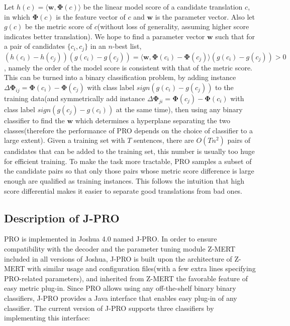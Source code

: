\documentclass[11pt]{article}
\begin{document}
Let $h(c)=\langle \mathbf{w},\mathbf{\Phi}(c)\rangle$ be the linear model score of a candidate translation $c$, in which $\mathbf{\Phi}(c)$ is the feature vector of $c$ and $\mathbf{w}$ is the parameter vector. Also let $g(c)$ be the metric score of $c$(without loss of generality, assuming higher score indicates better translation). We hope to find a parameter vector $\mathbf{w}$ such that for a pair of candidates $\{ c_i,c_j \}$ in an $n$-best list, $(h(c_i)-h(c_j))(g(c_i)-g(c_j))=\langle \mathbf{w},\mathbf{\Phi}(c_i) - \mathbf{\Phi}(c_j)\rangle (g(c_i)-g(c_j)) >0$, namely the order of the model score is consistent with that of the metric score. This can be turned into a binary classification problem, by adding instance $\Delta\mathbf{\Phi}_{ij}=\mathbf{\Phi}(c_i) - \mathbf{\Phi}(c_j)$ with class label $sign(g(c_i)-g(c_j))$ to the training data(and symmetrically add instance $\Delta\mathbf{\Phi}_{ji}=\mathbf{\Phi}(c_j) - \mathbf{\Phi}(c_i)$ with class label $sign(g(c_j)-g(c_i))$ at the same time), then using any binary classifier to find the $\mathbf{w}$ which determines a hyperplane separating the two classes(therefore the performance of PRO depends on the choice of classifier to a large extent). Given a training set with $T$ sentences, there are $O(Tn^2)$ pairs of candidates that can be added to the training set, this number is usually too huge for efficient training. To make the task more tractable, PRO samples a subset of the candidate pairs so that only those pairs whose metric score difference is large enough are qualified as training instances. This follows the intuition that high score differential makes it easier to separate good translations from bad ones.

\subsection{Description of J-PRO} \label{section:j-pro}
PRO is implemented in Joshua 4.0 named J-PRO. In order to ensure compatibility with the decoder and the parameter tuning module Z-MERT \cite{zaidan2009z} included in all versions of Joshua, J-PRO is built upon the architecture of Z-MERT with similar usage and configuration files(with a few extra lines specifying PRO-related parameters), and inherited from Z-MERT the favorable feature of easy metric plug-in. Since PRO allows using any off-the-shelf binary binary classifiers, J-PRO provides a Java interface that enables easy plug-in of any classifier. The current version of J-PRO supports three classifiers by implementing this interface:
\end{document}
